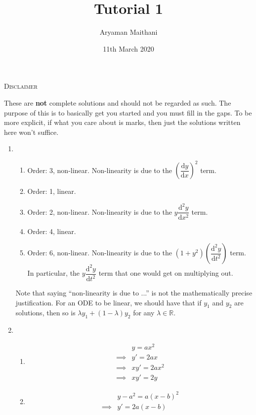 \documentclass[12pt]{article}
\title{Tutorial 1}				%
\author{Aryaman Maithani}
\date{11th March 2020}		%
\newcommand{\dd}{{\mathrm d}}
\begin{document}
\maketitle

\hrulefill

\begin{center}
	\textsc{Disclaimer}
\end{center}
These are \textbf{not} complete solutions and should not be regarded as such. The purpose of this is to basically get you started and you must fill in the gaps. To be more explicit, if what you care about is marks, then just the solutions written here won't suffice.

\hrulefill

\begin{enumerate}[label = Q.\arabic*.] 
	\item 
	\begin{enumerate}[label = (\roman*)] 
		\item Order: 3, non-linear. Non-linearity is due to the $\left(\dfrac{\dd y}{\dd x}\right)^2$ term.
		\item Order: 1, linear.
		\item Order: 2, non-linear. Non-linearity is due to the $y\dfrac{\dd^2y}{\dd x^2}$ term.
		\item Order: 4, linear.
		\item Order: 6, non-linear. Non-linearity is due to the $(1 + y^2)\left(\dfrac{\dd^2y}{\dd t^2}\right)$ term. In particular, the $y\dfrac{\dd^2y}{\dd t^2}$ term that one would get on multiplying out.
	\end{enumerate}
	Note that saying ``non-linearity is due to ...'' is not the mathematically precise justification. For an ODE to be linear, we should have that if $y_1$ and $y_2$ are solutions, then so is $\lambda y_1 + (1 - \lambda)y_2$ for any $\lambda \in \mathbb{R}.$
	\item \begin{enumerate}[label = (\roman*)] 
		\item \begin{align*} 
			& y = ax^2\\
			\implies & y' = 2ax\\
			\implies & xy' = 2ax^2\\
			\implies & xy' = 2y
		\end{align*}
		\item \begin{align*} 
			& y - a^2 = a(x - b)^2\\
			\implies & y' = 2a(x - b)\\

\end{align*}
\end{enumerate}
\end{enumerate}
\end{document}

